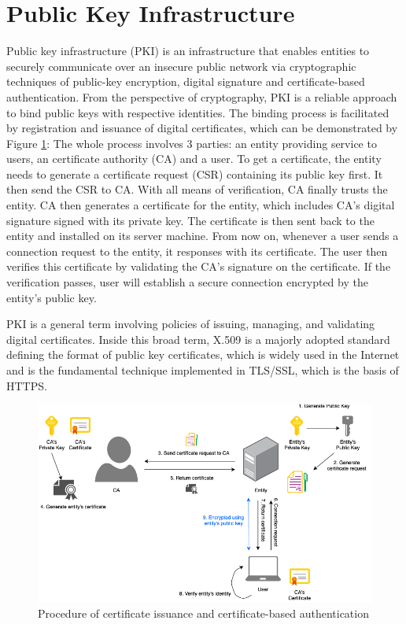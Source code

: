\section{Public Key Infrastructure}
\label{s:publickeyinfrastructure}

Public key infrastructure (PKI) is an infrastructure that enables entities to securely communicate over an insecure public network via cryptographic techniques of public-key encryption, digital signature and certificate-based authentication. From the perspective of cryptography, PKI is a reliable approach to bind public keys with respective identities. The binding process is facilitated by registration and issuance of digital certificates, which can be demonstrated by Figure \ref{fig:pki}: The whole process involves 3 parties: an entity providing service to users, an certificate authority (CA) and a user. To get a certificate, the entity needs to generate a certificate request (CSR) containing its public key first. It then send the CSR to CA. With all means of verification, CA finally trusts the entity. CA then generates a certificate for the entity, which includes CA's digital signature signed with its private key. The certificate is then sent back to the entity and installed on its server machine. From now on, whenever a user sends a connection request to the entity, it responses with its certificate. The user then verifies this certificate by validating the CA's signature on the certificate. If the verification passes, user will establish a secure connection encrypted by the entity's public key.

PKI is a general term involving policies of issuing, managing, and validating digital certificates. Inside this broad term, X.509\cite{rfc4158} is a majorly adopted standard defining the format of public key certificates, which is widely used in the Internet and is the fundamental technique implemented in TLS/SSL, which is the basis of HTTPS.

\begin{figure}[hbt]
\centering
  \includegraphics[width=14cm]{figures/pki.png}
  \caption{Procedure of certificate issuance and certificate-based authentication}
  \label{fig:pki}
\end{figure}